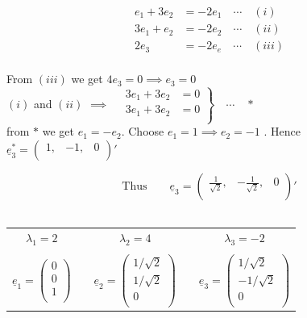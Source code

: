 \documentclass[11pt,a4paper]{article}
\theoremstyle{definition}
\begin{document}
\begin{enumerate}
\begin{enumerate}
\begin{align*}
e_1 + 3e_2 & = -2e_1 \quad  \cdots\quad  (i)\\
3e_1 + e_2 & = -2e_2 \quad   \cdots\quad  (ii)\\
      2e_3 & = -2e_e \quad  \cdots\quad  (iii)\\
\end{align*}

From $(iii)$ we get $4e_3 = 0 \implies e_3 =0$\\

$(i)$ and $(ii)$ $\implies\quad 
\left.\begin{aligned}
3e_1 + 3e_2 & = 0\\
3e_1 + 3e_2 & = 0\\
\end{aligned}
\right\}\quad  \cdots\quad  *
$\\

from $*$ we get $e_1 = -e_2$. Choose $e_1 = 1 \implies e_2 = -1$ . Hence $\underline{e}^*_3 = \begin{pmatrix}
1, & -1, & 0\\
\end{pmatrix}'$

$$\text{Thus}\qquad  \underline{e}_3 = \begin{pmatrix}
\frac{1}{\sqrt{2}}, & -\frac{1}{\sqrt{2}}, & 0\\
\end{pmatrix}'$$\\




\begin{table}[H]
\centering
\begin{tabular}{ccccc}
$\lambda_1 = 2$ && $\lambda_2 = 4$ && $\lambda_3 = -2$\\
&&&&\\
$\displaystyle{
\underline{e}_1 = 
\begin{pmatrix}
0\\
0\\
1\\
\end{pmatrix}
}$ && $\displaystyle{\underline{e}_2 = 
\begin{pmatrix}
1/\sqrt{2}\\
1/\sqrt{2}\\
0\\
\end{pmatrix}
}$  && $\displaystyle{\underline{e}_3=
\begin{pmatrix}
1/\sqrt{2}\\
-1/\sqrt{2}\\
0\\
\end{pmatrix}
}$
\end{tabular}
\end{table}




\end{enumerate}
\end{enumerate}
\end{document}

